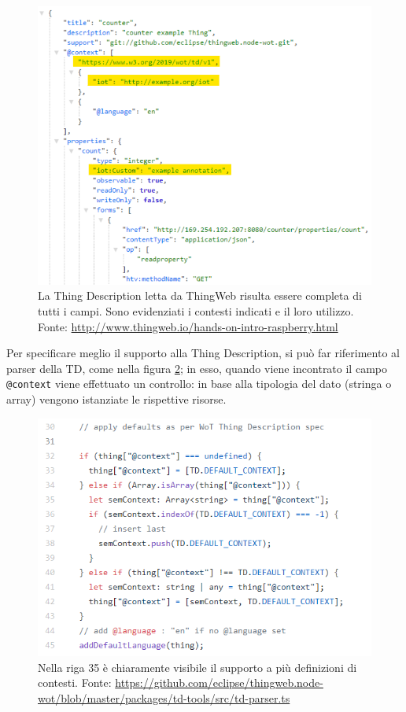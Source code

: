 \documentclass[12pt,a4paper,openright,oneside]{report}
\begin{document}
\begin{figure}[h]
	\centering
	\includegraphics[scale=0.8]{eps/context_ok_thingweb.png}
	\caption{La Thing Description letta da ThingWeb risulta essere completa di tutti i campi. Sono evidenziati i contesti indicati e il loro utilizzo. Fonte: \url{http://www.thingweb.io/hands-on-intro-raspberry.html}}
	\label{fig:context-ok-thingweb}
\end{figure}

Per specificare meglio il supporto alla Thing Description, si può far riferimento al parser della TD, come nella figura \ref{fig:context-ok-thingweb_2}; in esso, quando viene incontrato il campo \texttt{@context} viene effettuato un controllo: in base alla tipologia del dato (stringa o array) vengono istanziate le rispettive risorse.\\

\begin{figure}[h]
	\centering
	\includegraphics[scale=0.9]{eps/context_ok_thingweb_2.png}
	\caption{Nella riga 35 è chiaramente visibile il supporto a più definizioni di contesti. Fonte: \url{https://github.com/eclipse/thingweb.node-wot/blob/master/packages/td-tools/src/td-parser.ts}}
	\label{fig:context-ok-thingweb_2}
\end{figure}
\end{document}
